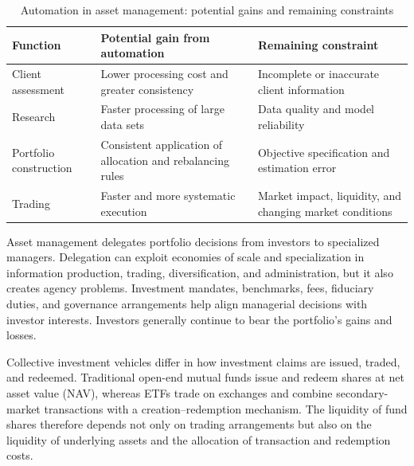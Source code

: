 \begin{table}[H]

\centering

\caption{Automation in asset management: potential gains and remaining constraints}

\label{tab:ch14-automation-asset-management}

\begin{tabularx}{0.94\textwidth}{@{}p{} X X@{}}

\toprule

\textbf{Function} & \textbf{Potential gain from automation} & \textbf{Remaining constraint} \\

\midrule

Client assessment
& Lower processing cost and greater consistency
& Incomplete or inaccurate client information \\

Research
& Faster processing of large data sets
& Data quality and model reliability \\

Portfolio construction
& Consistent application of allocation and rebalancing rules
& Objective specification and estimation error \\

Trading
& Faster and more systematic execution
& Market impact, liquidity, and changing market conditions \\

\bottomrule

\end{tabularx}

\end{table}



Asset management delegates portfolio decisions from investors
to specialized managers. Delegation can exploit economies of
scale and specialization in information production, trading,
diversification, and administration, but it also creates
agency problems. Investment mandates, benchmarks, fees,
fiduciary duties, and governance arrangements help align
managerial decisions with investor interests. Investors
generally continue to bear the portfolio's gains and losses.

Collective investment vehicles differ in how investment
claims are issued, traded, and redeemed. Traditional open-end
mutual funds issue and redeem shares at net asset value (NAV),
whereas ETFs trade on exchanges and combine secondary-market
transactions with a creation--redemption mechanism. The
liquidity of fund shares therefore depends not only on
trading arrangements but also on the liquidity of underlying
assets and the allocation of transaction and redemption costs.


